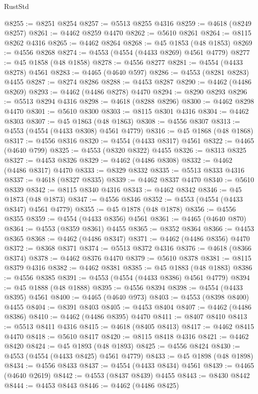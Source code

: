 \begin{lexlean}{RustStd}
\begin{coremodule}
@8255 := @8251 @8254
@8257 := @5513 @8255 @4316
@8259 := @4618 (@8249 @8257)
@8261 := @4462 @8259 @4470
@8262 := @5610 @8261
@8264 := @8115 @8262 @4316
@8265 := @4462 @8264
@8268 := @45 @1853 (@48 @1853)
@8269 := @4556 @8268
@8274 := @4553 (@4554 (@4433 @8269) @4561 @4779)
@8277 := @45 @1858 (@48 @1858)
@8278 := @4556 @8277
@8281 := @4554 (@4433 @8278) @4561
@8283 := @4465 (@4640 @597)
@8286 := @4553 (@8281 @8283) @4455
@8287 := @8274 @8286
@8288 := @4453 @8287
@8290 := @4462 (@4486 @8269)
@8293 := @4462 (@4486 @8278) @4470
@8294 := @8290 @8293
@8296 := @5513 @8294 @4316
@8298 := @4618 (@8288 @8296)
@8300 := @4462 @8298 @4470
@8301 := @5610 @8300
@8303 := @8115 @8301 @4316
@8304 := @4462 @8303
@8307 := @45 @1863 (@48 @1863)
@8308 := @4556 @8307
@8313 := @4553 (@4554 (@4433 @8308) @4561 @4779)
@8316 := @45 @1868 (@48 @1868)
@8317 := @4556 @8316
@8320 := @4554 (@4433 @8317) @4561
@8322 := @4465 (@4640 @799)
@8325 := @4553 (@8320 @8322) @4455
@8326 := @8313 @8325
@8327 := @4453 @8326
@8329 := @4462 (@4486 @8308)
@8332 := @4462 (@4486 @8317) @4470
@8333 := @8329 @8332
@8335 := @5513 @8333 @4316
@8337 := @4618 (@8327 @8335)
@8339 := @4462 @8337 @4470
@8340 := @5610 @8339
@8342 := @8115 @8340 @4316
@8343 := @4462 @8342
@8346 := @45 @1873 (@48 @1873)
@8347 := @4556 @8346
@8352 := @4553 (@4554 (@4433 @8347) @4561 @4779)
@8355 := @45 @1878 (@48 @1878)
@8356 := @4556 @8355
@8359 := @4554 (@4433 @8356) @4561
@8361 := @4465 (@4640 @870)
@8364 := @4553 (@8359 @8361) @4455
@8365 := @8352 @8364
@8366 := @4453 @8365
@8368 := @4462 (@4486 @8347)
@8371 := @4462 (@4486 @8356) @4470
@8372 := @8368 @8371
@8374 := @5513 @8372 @4316
@8376 := @4618 (@8366 @8374)
@8378 := @4462 @8376 @4470
@8379 := @5610 @8378
@8381 := @8115 @8379 @4316
@8382 := @4462 @8381
@8385 := @45 @1883 (@48 @1883)
@8386 := @4556 @8385
@8391 := @4553 (@4554 (@4433 @8386) @4561 @4779)
@8394 := @45 @1888 (@48 @1888)
@8395 := @4556 @8394
@8398 := @4554 (@4433 @8395) @4561
@8400 := @4465 (@4640 @973)
@8403 := @4553 (@8398 @8400) @4455
@8404 := @8391 @8403
@8405 := @4453 @8404
@8407 := @4462 (@4486 @8386)
@8410 := @4462 (@4486 @8395) @4470
@8411 := @8407 @8410
@8413 := @5513 @8411 @4316
@8415 := @4618 (@8405 @8413)
@8417 := @4462 @8415 @4470
@8418 := @5610 @8417
@8420 := @8115 @8418 @4316
@8421 := @4462 @8420
@8424 := @45 @1893 (@48 @1893)
@8425 := @4556 @8424
@8430 := @4553 (@4554 (@4433 @8425) @4561 @4779)
@8433 := @45 @1898 (@48 @1898)
@8434 := @4556 @8433
@8437 := @4554 (@4433 @8434) @4561
@8439 := @4465 (@4640 @2619)
@8442 := @4553 (@8437 @8439) @4455
@8443 := @8430 @8442
@8444 := @4453 @8443
@8446 := @4462 (@4486 @8425)

\end{coremodule}
\end{lexlean}
